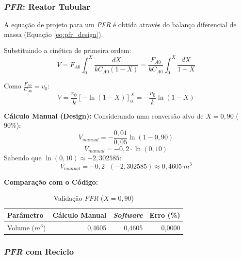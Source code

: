 \subsubsection{\textit{PFR}: Reator Tubular}

A equação de projeto para um \textit{PFR} é obtida através do balanço diferencial de massa (Equação \ref{eq:pfr_design}).

Substituindo a cinética de primeira ordem:
\begin{equation}
    V = F_{A0} \int_{0}^{X} \frac{dX}{k C_{A0} (1-X)} = \frac{F_{A0}}{k C_{A0}} \int_{0}^{X} \frac{dX}{1-X}
    \label{eq:val_pfr_deriv_1}
\end{equation}

Como $\frac{F_{A0}}{C_{A0}} = v_0$:
\begin{equation}
    V = \frac{v_0}{k} \left[ -\ln(1-X) \right]_{0}^{X} = -\frac{v_0}{k} \ln(1-X)
    \label{eq:val_pfr_deriv_2}
\end{equation}

\textbf{Cálculo Manual (Design):}
Considerando uma conversão alvo de $X = 0,90$ ($90\%$):
\begin{equation}
    V_{manual} = -\frac{0,01}{0,05} \ln(1 - 0,90)
    \label{eq:val_pfr_calc_1}
\end{equation}
\begin{equation}
    V_{manual} = -0,2 \cdot \ln(0,10)
    \label{eq:val_pfr_calc_2}
\end{equation}
Sabendo que $\ln(0,10) \approx -2,302585$:
\begin{equation}
    V_{manual} = -0,2 \cdot (-2,302585) \approx 0,4605 \ m^3
    \label{eq:val_pfr_calc_3}
\end{equation}

\textbf{Comparação com o Código:}
\begin{table}[H]
    \centering
    \caption{Validação \textit{PFR} ($X=0,90$)}
    \begin{tabular}{lrrr}
        \toprule
        \textbf{Parâmetro} & \textbf{Cálculo Manual} & \textbf{\textit{Software}} & \textbf{Erro (\%)} \\
        \midrule
        Volume ($m^3$) & 0,4605 & 0,4605 & 0,0000 \\
        \bottomrule
    \end{tabular}
\end{table}

\subsubsection{\textit{PFR} com Reciclo}

